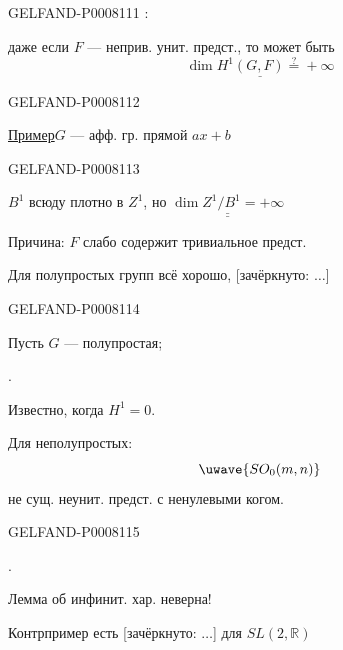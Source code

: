 \begin{GelfandAdjacentEvidence}{GELFAND-P000811}{1}
:

даже если \(F\) — неприв. унит. предст., то может быть
\[
\underline{\dim H^1(G,F)\mathrel{\overset{?}{=}}+\infty}
\]
\end{GelfandAdjacentEvidence}
\begin{GelfandAdjacentEvidence}{GELFAND-P000811}{2}


\uline{Пример}\qquad \(G\) — афф. гр. прямой\quad
\quad \(ax+b\)
\end{GelfandAdjacentEvidence}
\begin{GelfandAdjacentEvidence}{GELFAND-P000811}{3}


\(B^1\) всюду плотно в \(Z^1\), но \(\underline{\underline{\dim Z^1/B^1=+\infty}}\)

Причина: \(F\) слабо содержит тривиальное предст.

Для полупростых групп всё хорошо,
[зачёркнуто: \(\ldots\)]
\end{GelfandAdjacentEvidence}
\begin{GelfandAdjacentEvidence}{GELFAND-P000811}{4}


Пусть \(G\) — полупростая;

.

Известно, когда \(H^1=0\).

Для неполупростых:
\[
\text{\uwave{\(\displaystyle SO_0(m,n)\)}}
\]
не сущ. неунит. предст. с ненулевыми когом.

\end{GelfandAdjacentEvidence}
\begin{GelfandAdjacentEvidence}{GELFAND-P000811}{5}


.

Лемма об инфинит. хар. неверна!

Контрпример есть [зачёркнуто: \(\ldots\)] для \(SL(2,\mathbb R)\)
\end{GelfandAdjacentEvidence}
